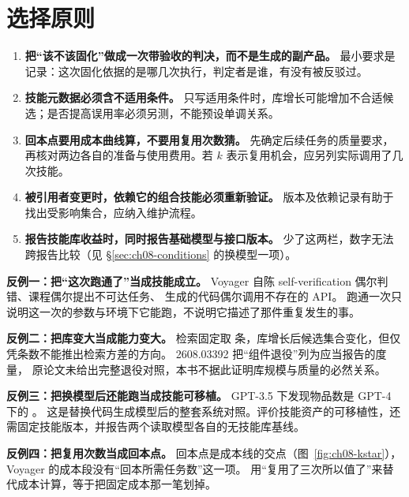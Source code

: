 \section{选择原则}
\label{sec:ch08-choice}

\begin{enumerate}
  \item \textbf{把``该不该固化''做成一次带验收的判决，而不是生成的副产品。}
        最小要求是记录：这次固化依据的是哪几次执行，判定者是谁，有没有被反驳过。
  \item \textbf{技能元数据必须含不适用条件。}
        只写适用条件时，库增长可能增加不合适候选；是否提高误用率必须另测，不能预设单调关系。
  \item \textbf{回本点要用成本曲线算，不要用复用次数猜。}
        先确定后续任务的质量要求，再核对两边各自的准备与使用费用。若 $k$ 表示复用机会，应另列实际调用了几次技能。
  \item \textbf{被引用者变更时，依赖它的组合技能必须重新验证。}
        版本及依赖记录有助于找出受影响集合，应纳入维护流程。
  \item \textbf{报告技能库收益时，同时报告基础模型与接口版本。}
        少了这两栏，数字无法跨报告比较（见 §\ref{sec:ch08-conditions} 的换模型一项）。
\end{enumerate}

\begin{pitfallbox}
\textbf{反例一：把``这次跑通了''当成技能成立。}
Voyager 自陈 self-verification 偶尔判错、课程偶尔提出不可达任务、
生成的代码偶尔调用不存在的 API\cite{voyager-2305}。
跑通一次只说明这一次的参数与环境下它能跑，不说明它描述了那件重复发生的事。

\textbf{反例二：把库变大当成能力变大。}
检索固定取  条\cite{voyager-2305}，库增长后候选集合变化，但仅凭条数不能推出检索方差的方向。
2608.03392 把``组件退役''列为应当报告的度量\cite{coding-survey-2608}，
原论文未给出完整退役对照，本书不据此证明库规模与质量的必然关系。

\textbf{反例三：把换模型后还能跑当成技能可移植。}
GPT-3.5 下发现物品数是 GPT-4 下的 \cite{voyager-2305}。
这是替换代码生成模型后的整套系统对照。评价技能资产的可移植性，还需固定技能版本，并报告两个读取模型各自的无技能库基线。

\textbf{反例四：把复用次数当成回本点。}
回本点是成本线的交点（图~\ref{fig:ch08-kstar}），
Voyager 的成本段没有``回本所需任务数''这一项\cite{voyager-2305}。
用``复用了三次所以值了''来替代成本计算，等于把固定成本那一笔划掉。
\end{pitfallbox}

